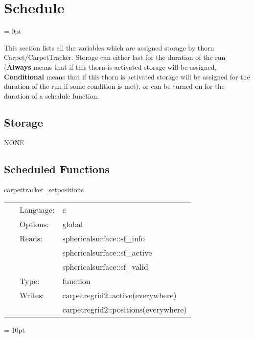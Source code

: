 
\section{Schedule} 


\parskip = 0pt


\noindent This section lists all the variables which are assigned storage by thorn Carpet/CarpetTracker.  Storage can either last for the duration of the run ({\bf Always} means that if this thorn is activated storage will be assigned, {\bf Conditional} means that if this thorn is activated storage will be assigned for the duration of the run if some condition is met), or can be turned on for the duration of a schedule function.


\subsection*{Storage}NONE
\subsection*{Scheduled Functions}
\vspace{5mm}


\hspace{5mm} carpettracker\_setpositions 

\hspace{5mm}{\it set positions of refined regions } 


\hspace{5mm}

 \begin{tabular*}{160mm}{cll} 
~ & Language:  & c \\ 
~ & Options:  & global \\ 
~ & Reads:  & sphericalsurface::sf\_info \\ 
~& ~ &sphericalsurface::sf\_active\\ 
~& ~ &sphericalsurface::sf\_valid\\ 
~ & Type:  & function \\ 
~ & Writes:  & carpetregrid2::active(everywhere) \\ 
~& ~ &carpetregrid2::positions(everywhere)\\ 
\end{tabular*} 



\vspace{5mm}\parskip = 10pt 
